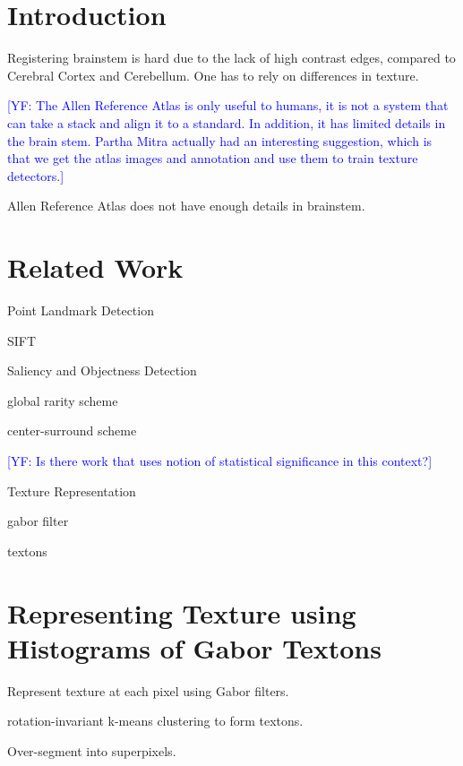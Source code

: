 \documentclass{llncs}
\newcommand{\authcmt}[2]{\textcolor{#1}{#2}}
\newcommand{\yoav}[1]{\authcmt{blue}{[YF: #1]}}
\begin{document}
\section{Introduction}
%

Registering brainstem is hard due to the lack of high contrast edges,
compared to Cerebral Cortex and Cerebellum. One has to rely on
differences in texture.

\yoav{The Allen Reference Atlas is only useful to humans, it is not a
  system that can take a stack and align it to a standard. In
  addition, it has limited details in the brain stem. Partha Mitra
  actually had an interesting suggestion, which is that we get the
  atlas images and annotation and use them to train texture
  detectors.}

Allen Reference Atlas does not have enough details in brainstem.

\section{Related Work}

\begin{description}

\item{Point Landmark Detection}

SIFT

\item{Saliency and Objectness Detection}

global rarity scheme

center-surround scheme

\yoav{Is there work that uses notion of statistical significance in
  this context?}

\item{Texture Representation}

gabor filter

textons

\end{description}

\section{Representing Texture using Histograms of Gabor Textons}

Represent texture at each pixel using Gabor filters.

rotation-invariant k-means clustering to form textons.

Over-segment into superpixels.
\end{document}
